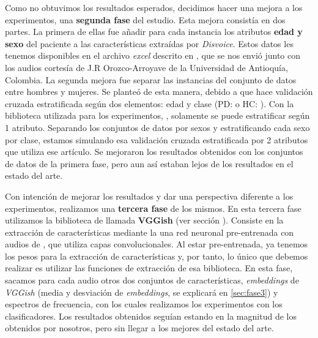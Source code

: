 Como no obtuvimos los resultados esperados, decidimos hacer una mejora a los experimentos, una \textbf{segunda fase} del estudio. Esta mejora consistía en dos partes. La primera de ellas fue añadir para cada instancia los atributos \textbf{edad y sexo} del paciente a las características extraídas por \textit{Disvoice}. Estos datos les tenemos disponibles en el archivo \textit{excel} descrito en \cite{OrzCorpus}, que se nos envió junto con los audios cortesía de J.R Orozco-Arroyave de la Universidad de Antioquía, Colombia. La segunda mejora fue separar las instancias del conjunto de datos entre hombres y mujeres. Se planteó de esta manera, debido a que \cite{Orz2016} hace validación cruzada estratificada según dos elementos: edad y clase (PD:  o HC: ). Con la biblioteca utilizada para los experimentos, , solamente se puede estratificar según 1 atributo. Separando los conjuntos de datos por sexos y estratificando cada sexo por clase, estamos simulando esa validación cruzada estratificada por 2 atributos que utiliza ese artículo. Se mejoraron los resultados obtenidos con los conjuntos de datos de la primera fase, pero aun así estaban lejos de los resultados en el estado del arte.

Con intención de mejorar los resultados y dar una perspectiva diferente a los experimentos, realizamos una \textbf{tercera fase} de los mismos. En esta tercera fase utilizamos la biblioteca de  llamada \textbf{VGGish} \cite{vggish} (ver sección \label{subsec:vggish}). Consiste en la extracción de características mediante la una red neuronal pre-entrenada con audios de ,  que utiliza capas convolucionales. Al estar pre-entrenada, ya tenemos los pesos para la extracción de características y, por tanto, lo único que debemos realizar es utilizar las funciones de extracción de esa biblioteca. En esta fase, sacamos para cada audio otros dos conjuntos de características, \textit{embeddings} de \textit{VGGish} (media y desviación de \textit{embeddings}, se explicará en \ref{sec:fase3}) y espectros de frecuencia, con los cuales realizamos los experimentos con los clasificadores. Los resultados obtenidos seguían estando en la magnitud de los obtenidos por nosotros, pero sin llegar a los mejores del estado del arte.

